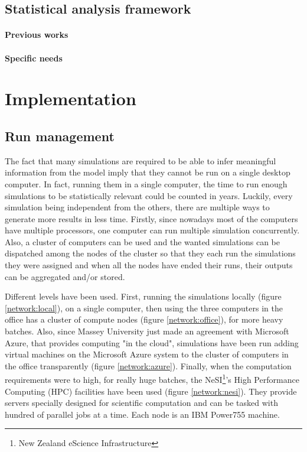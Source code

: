 \documentclass[a4paper,12pt]{report}
\begin{document}
\section{Statistical analysis framework}
\subsubsection{Previous works}
\subsubsection{Specific needs}


\chapter{Implementation}

\section{Run management}
The fact that many simulations are required to be able to infer meaningful information from the model imply that they cannot be run on a single desktop computer. In fact, running them in a single computer, the time to run enough simulations to be statistically relevant could be counted in years.
Luckily, every simulation being independent from the others, there are multiple ways to generate more results in less time.
Firstly, since nowadays most of the computers have multiple processors, one computer can run multiple simulation concurrently. Also, a cluster of computers can be used and the wanted simulations can be dispatched among the nodes of the cluster so that they each run the simulations they were assigned and when all the nodes have ended their runs, their outputs can be aggregated and/or stored.

Different levels have been used. First, running the simulations locally (figure \ref{network:local}), on a single computer, then using the three computers in the office has a cluster of compute nodes (figure \ref{network:office}), for more heavy batches. Also, since Massey University just made an agreement with Microsoft Azure, that provides computing "in the cloud", simulations have been run adding virtual machines on the Microsoft Azure system to the cluster of computers in the office transparently (figure \ref{network:azure}).
Finally, when the computation requirements were to high, for really huge batches, the NeSI\footnote{New Zealand eScience Infrastructure}'s High Performance Computing (HPC) facilities have been used (figure \ref{network:nesi}). They provide servers specially designed for scientific computation and can be tasked with hundred of parallel jobs at a time. Each node is an IBM Power755 machine.
\end{document}
